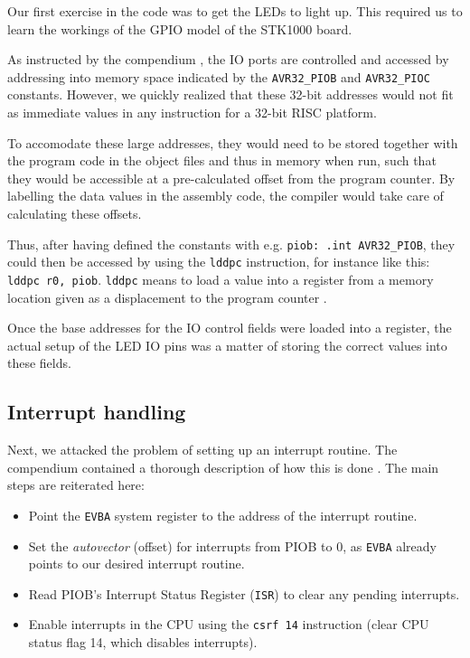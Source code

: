 Our first exercise in the code was to get the LEDs to light up. This
required us to learn the workings of the GPIO model of the STK1000
board.

As instructed by the compendium \cite{comp}, the IO ports are controlled
and accessed by addressing into memory space indicated by the
\texttt{AVR32\_PIOB} and \texttt{AVR32\_PIOC} constants. However, we
quickly realized that these 32-bit addresses would not fit as immediate
values in any instruction for a 32-bit RISC platform.

To accomodate these large addresses, they would need to be stored
together with the program code in the object files and thus in memory
when run, such that they would be accessible at a pre-calculated offset
from the program counter. By labelling the data values in the assembly
code, the compiler would take care of calculating these offsets.

Thus, after having defined the constants with e.g. \texttt{piob: .int
AVR32\_PIOB}, they could then be accessed by using the \texttt{lddpc}
instruction, for instance like this: \texttt{lddpc r0, piob}.
\texttt{lddpc} means to load a value into a register from a memory
location given as a displacement to the program counter \cite{avr32}.

Once the base addresses for the IO control fields were loaded into a
register, the actual setup of the LED IO pins was a matter of storing
the correct values into these fields.

\subsection{Interrupt handling}

Next, we attacked the problem of setting up an interrupt routine. The
compendium contained a thorough description of how this is done
\cite{comp}. The main steps are reiterated here:

\begin{itemize}
    \item Point the \texttt{EVBA} system register to the address of the
    interrupt routine.
    \item Set the \emph{autovector} (offset) for interrupts from PIOB to
    0, as \texttt{EVBA} already points to our desired interrupt routine.
    \item Read PIOB's Interrupt Status Register (\texttt{ISR}) to clear
    any pending interrupts.
    \item Enable interrupts in the CPU using the \texttt{csrf 14}
    instruction (clear CPU status flag 14, which disables interrupts).
\end{itemize}

